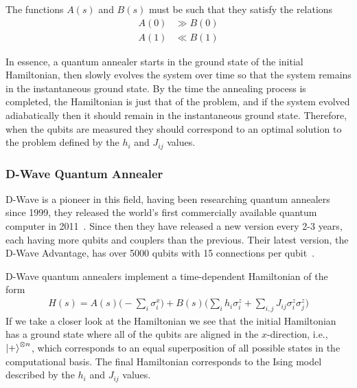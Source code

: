 The functions \( A(s) \) and \( B(s) \) must be such that they satisfy the relations
\begin{align}
    A(0) &\gg B(0) \\
    A(1) &\ll B(1)
\end{align}

In essence, a quantum annealer starts in the ground state of the initial Hamiltonian, then slowly evolves the system over time so that the system remains in the instantaneous ground state.
By the time the annealing process is completed, the Hamiltonian is just that of the problem, and if the system evolved adiabatically then it should remain in the instantaneous ground state.
Therefore, when the qubits are measured they should correspond to an optimal solution to the problem defined by the \( h_i \) and \( J_{ij} \) values.

\subsubsection{D-Wave Quantum Annealer}
D-Wave is a pioneer in this field, having been researching quantum annealers since 1999, they released the world's first commercially available quantum computer in 2011~\cite{zyga_2011}.
Since then they have released a new version every 2-3 years, each having more qubits and couplers than the previous.
Their latest version, the D-Wave Advantage, has over 5000 qubits with 15 connections per qubit~\cite{dwave_advantage}.

D-Wave quantum annealers implement a time-dependent Hamiltonian of the form~\cite{dwave_qa}
\begin{align}
    H(s) = A(s) \bigg( -\sum_i \sigma_i^x \bigg) + B(s) \bigg( \sum_i h_i \sigma_i^z + \sum_{i,j} J_{ij} \sigma_i^z \sigma_j^z \bigg)
\end{align}
If we take a closer look at the Hamiltonian we see that the initial Hamiltonian has a ground state where all of the qubits are aligned in the \( x \)-direction, i.e., \( \ket{+}^{\otimes n} \), which corresponds to an equal superposition of all possible states in the computational basis.
The final Hamiltonian corresponds to the Ising model described by the \( h_i \) and \( J_{ij} \) values.

